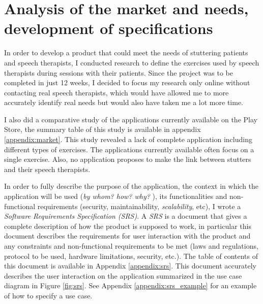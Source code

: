 
\section{Analysis of the market and needs, development of specifications}
In order to develop a product that could meet the needs of stuttering patients and speech therapists, I conducted research to define the exercises used by speech therapists during sessions with their patients. Since the project was to be completed in just 12 weeks, I decided to focus my research only online without contacting real speech therapists, which would have allowed me to more accurately identify real needs but would also have taken me a lot more time.

I also did a comparative study of the applications currently available on the Play Store, the summary table of this study is available in appendix \ref{appendix:market}. This study revealed a lack of complete application including different types of exercises. The applications currently available often focus on a single exercise. Also, no application proposes to make the link between stutters and their speech therapists.

In order to fully describe the purpose of the application, the context in which the application will be used (\textit{by whom? how? why? }), its functionalities and non-functional requirements (security, maintainability, \textit{scalability}, etc), I wrote a \textit{Software Requirements Specification (SRS)}. A \textit{SRS} is a document that gives a complete description of how the product is supposed to work, in particular this document describes the requirements for user interaction with the product and any constraints and non-functional requirements to be met (laws and regulations, protocol to be used, hardware limitations, security, etc.). The table of contents of this document is available in Appendix \ref{appendix:srs}. This document accurately describes the user interaction on the application summarized in the use case diagram in Figure \ref{fig:srs}. See Appendix \ref{appendix:srs_example} for an example of how to specify a use case.

